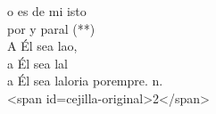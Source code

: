 \begin{cancion}%
	o es de mi isto\\
	por  y paral (**)\\
	A Él sea lao,\\
	a Él sea lal \\
	a Él sea laloria porempre. n. \\
<span id=cejilla-original>2</span>\\
\end{cancion}%
